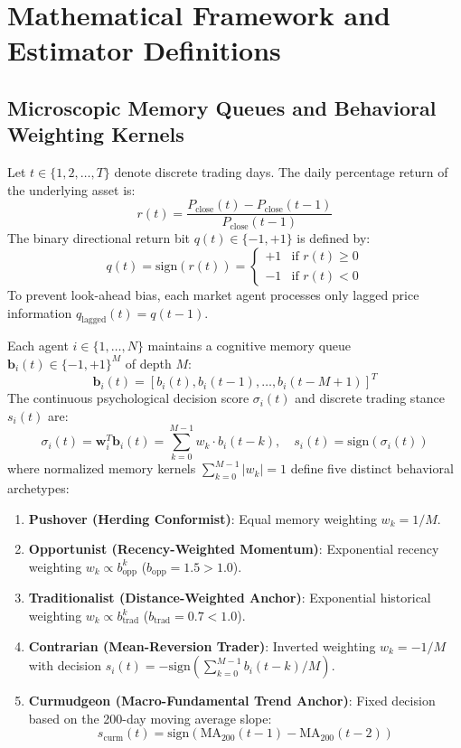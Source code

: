 \section{Mathematical Framework and Estimator Definitions}

\subsection{Microscopic Memory Queues and Behavioral Weighting Kernels}
Let $t \in \{1, 2, \dots, T\}$ denote discrete trading days. The daily percentage return of the underlying asset is:
\begin{equation}
    r(t) = \frac{P_{\text{close}}(t) - P_{\text{close}}(t-1)}{P_{\text{close}}(t-1)}
\end{equation}
The binary directional return bit $q(t) \in \{-1, +1\}$ is defined by:
\begin{equation}
    q(t) = \text{sign}(r(t)) = 
    \begin{cases}
        +1 & \text{if } r(t) \ge 0 \\
        -1 & \text{if } r(t) < 0
    \end{cases}
\end{equation}
To prevent look-ahead bias, each market agent processes only lagged price information $q_{\text{lagged}}(t) = q(t-1)$.

Each agent $i \in \{1, \dots, N\}$ maintains a cognitive memory queue $\mathbf{b}_i(t) \in \{-1, +1\}^M$ of depth $M$:
\begin{equation}
    \mathbf{b}_i(t) = [b_i(t), b_i(t-1), \dots, b_i(t-M+1)]^T
\end{equation}
The continuous psychological decision score $\sigma_i(t)$ and discrete trading stance $s_i(t)$ are:
\begin{equation}
    \sigma_i(t) = \mathbf{w}_i^T \mathbf{b}_i(t) = \sum_{k=0}^{M-1} w_k \cdot b_i(t-k), \quad s_i(t) = \text{sign}(\sigma_i(t))
\end{equation}
where normalized memory kernels $\sum_{k=0}^{M-1} |w_k| = 1$ define five distinct behavioral archetypes:
\begin{enumerate}
    \item \textbf{Pushover (Herding Conformist)}: Equal memory weighting $w_k = 1/M$.
    \item \textbf{Opportunist (Recency-Weighted Momentum)}: Exponential recency weighting $w_k \propto b_{\text{opp}}^k$ ($b_{\text{opp}} = 1.5 > 1.0$).
    \item \textbf{Traditionalist (Distance-Weighted Anchor)}: Exponential historical weighting $w_k \propto b_{\text{trad}}^k$ ($b_{\text{trad}} = 0.7 < 1.0$).
    \item \textbf{Contrarian (Mean-Reversion Trader)}: Inverted weighting $w_k = -1/M$ with decision $s_i(t) = -\text{sign}(\sum_{k=0}^{M-1} b_i(t-k)/M)$.
    \item \textbf{Curmudgeon (Macro-Fundamental Trend Anchor)}: Fixed decision based on the 200-day moving average slope:
    \begin{equation}
        s_{\text{curm}}(t) = \text{sign}\left( \text{MA}_{200}(t-1) - \text{MA}_{200}(t-2) \right)
    \end{equation}
\end{enumerate}

